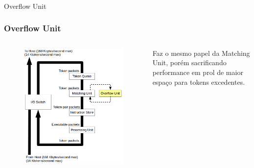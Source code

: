 \documentclass{beamer}
\begin{document}
\begin{frame}{Overflow Unit}
	\subsubsection{Overflow Unit}
	\begin{columns}
		\column{6cm}
			\begin{figure}
				\centering
				\includegraphics[width=\textwidth]{OverflowUnit}
			\end{figure}

			Faz o mesmo papel da Matching Unit, porém sacrificando performance em prol de maior espaço para tokens excedentes.
	\end{columns}
\end{frame}
\end{document}
